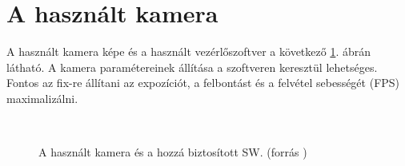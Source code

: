 	\newpage



\section{A használt kamera}
	
	A használt kamera képe és a használt vezérlőszoftver a következő \ref{fig:cam}. ábrán látható.
	A kamera paramétereinek állítása a szoftveren keresztül lehetséges. Fontos az fix-re állítani az expozíciót, a felbontást
	és a felvétel sebességét (FPS) maximalizálni. 

\begin{figure}[htp]
\centering
	\\
	\caption[A használt kamera és a hozzá biztosított SW.]{A használt kamera és a hozzá biztosított SW.
	(forrás \cite{gx1050})}
	\label{fig:cam}
\end{figure}

